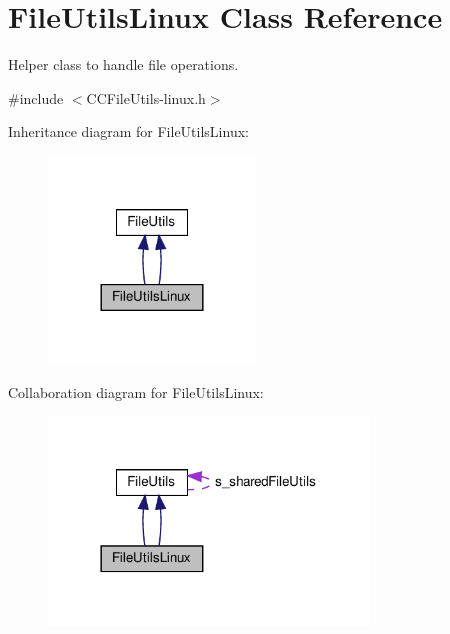 \hypertarget{classFileUtilsLinux}{}\section{File\+Utils\+Linux Class Reference}
\label{classFileUtilsLinux}


Helper class to handle file operations.  




{\ttfamily \#include $<$C\+C\+File\+Utils-\/linux.\+h$>$}



Inheritance diagram for File\+Utils\+Linux\+:
\nopagebreak
\begin{figure}[H]
\begin{center}
\leavevmode
\includegraphics[width=156pt]{classFileUtilsLinux__inherit__graph}
\end{center}
\end{figure}


Collaboration diagram for File\+Utils\+Linux\+:
\nopagebreak
\begin{figure}[H]
\begin{center}
\leavevmode
\includegraphics[width=242pt]{classFileUtilsLinux__coll__graph}
\end{center}
\end{figure}
